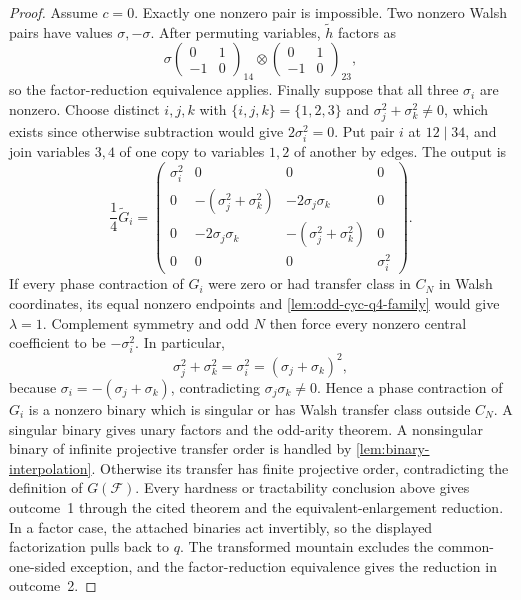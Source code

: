 \documentclass[11pt,letterpaper,onecolumn]{article}
\theoremstyle{plain}
\theoremstyle{definition}
\theoremstyle{remark}
\newcommand{\cF}{\mathcal F}
\begin{document}
\begin{proof}
		Assume \(c=0\).  Exactly one nonzero pair is impossible.  Two nonzero Walsh pairs have
		values \(\sigma,-\sigma\). After permuting variables, \(\widetilde h\) factors as
		\[
		\sigma
		\begin{pmatrix}0&1\\-1&0\end{pmatrix}_{14}\otimes
		\begin{pmatrix}0&1\\-1&0\end{pmatrix}_{23},
		\]
		so the factor-reduction equivalence applies.  Finally suppose that all three \(\sigma_i\)
		are nonzero.  Choose distinct \(i,j,k\) with
		\(\{i,j,k\}=\{1,2,3\}\) and \(\sigma_j^2+\sigma_k^2\ne0\), which exists since otherwise subtraction
		would give \(2\sigma_i^2=0\).  Put pair \(i\) at \(12\mid34\), and join
		variables \(3,4\) of one copy to variables \(1,2\) of another by edges.  The
		output is
		\begin{equation*}
			\frac14\widetilde G_i=
			\begin{pmatrix}
				\sigma_i^2&0&0&0\\
				0&-(\sigma_j^2+\sigma_k^2)&-2\sigma_j\sigma_k&0\\
				0&-2\sigma_j\sigma_k&-(\sigma_j^2+\sigma_k^2)&0\\
				0&0&0&\sigma_i^2
			\end{pmatrix}.
		\end{equation*}
		If every phase contraction of \(G_i\) were zero or had transfer class in
		\(C_N\) in Walsh coordinates, its equal nonzero endpoints and
		\cref{lem:odd-cyc-q4-family} would give \(\lambda=1\). Complement symmetry
		and odd \(N\) then force every nonzero central coefficient to be
		\(-\sigma_i^2\).  In particular,
		\[
		\sigma_j^2+\sigma_k^2=\sigma_i^2=(\sigma_j+\sigma_k)^2,
		\]
		because \(\sigma_i=-(\sigma_j+\sigma_k)\), contradicting
		\(\sigma_j\sigma_k\ne0\).  Hence a phase contraction of \(G_i\) is a
		nonzero binary which is singular or has Walsh transfer class outside
		\(C_N\).  A singular binary gives unary factors and the odd-arity theorem.
		A nonsingular binary of infinite projective transfer order is handled by
		\cref{lem:binary-interpolation}.  Otherwise its transfer has finite
		projective order, contradicting the definition of \(G(\cF)\).
		Every hardness or tractability conclusion above gives outcome~1 through the
		cited theorem and the equivalent-enlargement reduction.  In a
		factor case, the attached binaries act invertibly, so the displayed
		factorization pulls back to \(q\). The transformed mountain excludes the
		common-one-sided exception, and the factor-reduction equivalence gives the
		reduction in outcome~2.
	\end{proof}
	
\end{document}
